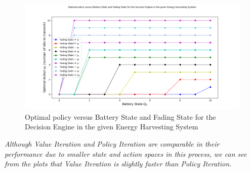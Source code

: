 \documentclass[12pt, draftcls, onecolumn]{IEEEtran}
\begin{document}
\begin{figure}[t]
\includegraphics[width=1.0\textwidth]{Optimal_Policy_vs_Battery_State_with_Fading_State_Increased_Confidence.png}
\caption{Optimal policy versus Battery State and Fading State for the Decision Engine in the given Energy Harvesting System}
\label{fig:mesh6}
\centering
\end{figure}
\textit{Although Value Iteration and Policy Iteration are comparable in their performance due to smaller state and action spaces in this process, we can see from the plots that Value Iteration is slightly faster than Policy Iteration.}
\end{document}
